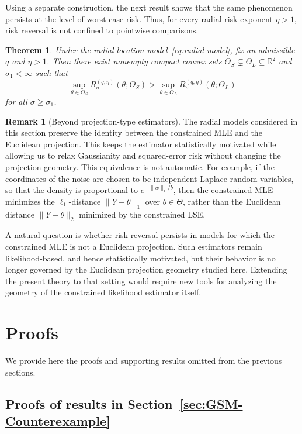 \documentclass[11pt]{article}
\theoremstyle{plain}
\newtheorem{theorem}{Theorem}[section]
\theoremstyle{definition}
\newtheorem*{remark}{Remark}
\begin{document}
Using a separate construction, the next result shows that the same phenomenon
persists at the level of worst-case risk. Thus, for every radial risk exponent
$\eta>1$, risk reversal is not confined to pointwise comparisons.

\begin{theorem}
\label{thm:radial-worst-case-all-eta}
Under the radial location model~\eqref{eq:radial-model}, fix an admissible
$q$ and $\eta>1$. Then there exist nonempty compact convex sets
$\Theta_S\subsetneq \Theta_L\subseteq\mathbb R^2$ and
$\sigma_1<\infty$ such that
\[
    \sup_{\theta\in\Theta_S}
    R_{\sigma}^{(q,\eta)}(\theta;\Theta_S)
    >
    \sup_{\theta\in\Theta_L}
    R_{\sigma}^{(q,\eta)}(\theta;\Theta_L)
\]
for all $\sigma\ge \sigma_1$.
\end{theorem}


\begin{remark}[Beyond projection-type estimators]
The radial models considered in this section preserve the identity between the
constrained MLE and the Euclidean projection. This keeps the estimator
statistically motivated while allowing us to relax Gaussianity and squared-error
risk without changing the projection geometry. This equivalence is not automatic. For example, if the coordinates of the noise are chosen to be independent Laplace random
variables, so that the density is proportional to $e^{-\|w\|_1/b}$, then the
constrained MLE minimizes the $\ell_1$-distance $\|Y-\theta\|_1$ over
$\theta\in\Theta$, rather than the Euclidean distance $\|Y-\theta\|_2$
minimized by the constrained LSE. 

A natural question is whether risk reversal persists in models for which the constrained MLE is not a Euclidean projection. Such estimators remain likelihood-based, and hence
statistically motivated, but their behavior is no longer governed by the
Euclidean projection geometry studied here. Extending the present theory to
that setting would require new tools for analyzing the geometry of the
constrained likelihood estimator itself.
\end{remark}



\section{Proofs}\label{sec:proofs}
We provide here the proofs and supporting results omitted from the previous
sections.


\subsection{Proofs of results in Section~\ref{sec:GSM-Counterexample}}
\end{document}
